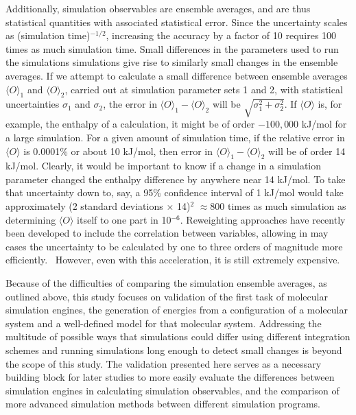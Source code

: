 Additionally, simulation observables are ensemble averages, and are
thus statistical quantities with associated statistical error. Since
the uncertainty scales as (simulation time)$^{-1/2}$, increasing the
accuracy by a factor of 10 requires 100 times as much simulation
time. Small differences in the parameters used to run the simulations
simulations give rise to similarly small changes in the ensemble
averages. If we attempt to calculate a small difference between
ensemble averages $\langle O \rangle_1$ and $\langle O \rangle_2$,
carried out at simulation parameter sets 1 and 2, with statistical
uncertainties $\sigma_1$ and $\sigma_2$, the error in $\langle O
\rangle_1 - \langle O \rangle_2$ will be
$\sqrt{\sigma_1^2+\sigma_2^2}$. If $\langle O \rangle$ is, for
example, the enthalpy of a calculation, it might be of order
$-100,000$ kJ/mol for a large simulation.  For a given amount of
simulation time, if the relative error in $\langle O \rangle$ is
0.0001\% or about 10 kJ/mol, then error in $\langle O\rangle_1 -
\langle O \rangle_2$ will be of order 14 kJ/mol. Clearly, it would be
important to know if a change in a simulation parameter changed the
enthalpy difference by anywhere near 14 kJ/mol. To take that
uncertainty down to, say, a 95\% confidence interval of 1 kJ/mol would
take approximately (2 standard deviations $\times$ 14)$^2$ $\approx 800$ times as much
simulation as determining $\langle O \rangle$ itself to one part in
10$^{-6}$.  Reweighting approaches have recently been developed to
include the correlation between variables, allowing in may cases the
uncertainty to be calculated by one to three orders of magnitude more
efficiently.~\cite{Paliwal2013} However, even with this acceleration,
it is still extremely expensive.

Because of the difficulties of comparing the simulation ensemble
averages, as outlined above, this study focuses on validation of the
first task of molecular simulation engines, the generation of energies
from a configuration of a molecular system and a well-defined model
for that molecular system. Addressing the multitude of possible ways
that simulations could differ using different integration schemes and
running simulations long enough to detect small changes is beyond the
scope of this study. The validation presented here serves as a
necessary building block for later studies to more easily evaluate the
differences between simulation engines in calculating simulation
observables, and the comparison of more advanced simulation methods
between different simulation programs.

